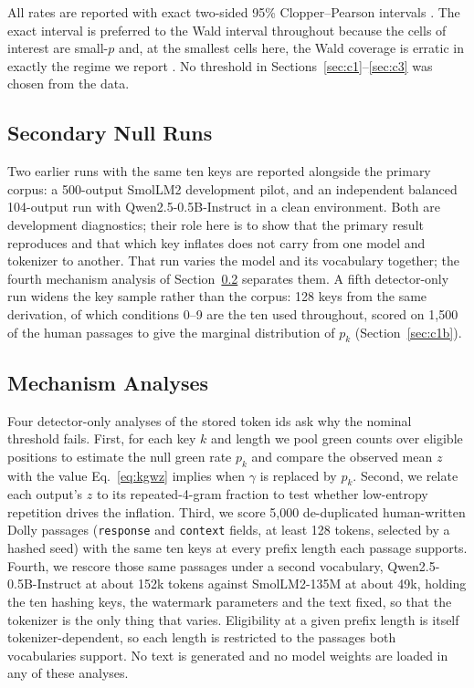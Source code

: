 \documentclass[conference]{IEEEtran}
\begin{document}
All rates are reported with exact two-sided 95\% Clopper--Pearson intervals
\citep{clopper1934confidence}. The exact interval is preferred to the Wald
interval throughout because the cells of interest are small-$p$ and, at the
smallest cells here, the Wald coverage is erratic in exactly the regime we report
\citep{brown2001interval}. No threshold in
Sections~\ref{sec:c1}--\ref{sec:c3} was chosen from the data.

\subsection{Secondary Null Runs}

Two earlier runs with the same ten keys are reported alongside the primary corpus:
a 500-output SmolLM2 development pilot, and an independent balanced 104-output run
with Qwen2.5-0.5B-Instruct in a clean environment. Both are development
diagnostics; their role here is to show that the primary result reproduces and
that which key inflates does not carry from one model and tokenizer to another.
That run varies the model and its vocabulary together; the fourth mechanism
analysis of Section~\ref{sec:mech-methods} separates them. A fifth detector-only
run widens the key sample rather than the corpus: 128 keys from the same
derivation, of which conditions 0--9 are the ten used throughout, scored on 1,500
of the human passages to give the marginal distribution of $p_k$
(Section~\ref{sec:c1b}).

\subsection{Mechanism Analyses}
\label{sec:mech-methods}

Four detector-only analyses of the stored token ids ask why the nominal
threshold fails. First, for each key $k$ and length we pool green counts over
eligible positions to estimate the null green rate $p_k$ and compare the observed
mean $z$ with the value Eq.~\eqref{eq:kgwz} implies when $\gamma$ is replaced by
$p_k$. Second, we relate each output's $z$ to its repeated-4-gram fraction to test
whether low-entropy repetition drives the inflation. Third, we score 5,000
de-duplicated human-written Dolly passages (\texttt{response} and \texttt{context}
fields, at least 128 tokens, selected by a hashed seed) with the same ten keys at
every prefix length each passage supports. Fourth, we rescore those same
passages under a second vocabulary, Qwen2.5-0.5B-Instruct at about 152k tokens
against SmolLM2-135M at about 49k, holding the ten hashing keys, the watermark
parameters and the text fixed, so that the tokenizer is the only thing that
varies. Eligibility at a given prefix length is itself tokenizer-dependent, so
each length is restricted to the passages both vocabularies support. No text is
generated and no model weights are loaded in any of these analyses.
\end{document}

